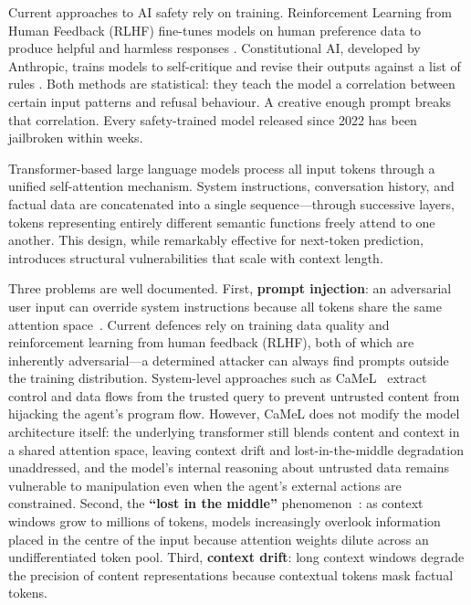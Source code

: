 \documentclass[11pt,a4paper]{article}
\theoremstyle{definition}
\begin{document}
Current approaches to AI safety rely on training. Reinforcement Learning from Human Feedback (RLHF) fine-tunes models on human preference data to produce helpful and harmless responses \cite{bai2022training}. Constitutional AI, developed by Anthropic, trains models to self-critique and revise their outputs against a list of rules \cite{bai2022constitutional}. Both methods are statistical: they teach the model a correlation between certain input patterns and refusal behaviour. A creative enough prompt breaks that correlation. Every safety-trained model released since 2022 has been jailbroken within weeks.

Transformer-based large language models \cite{Vaswani2017AttentionIA} process all input tokens through a unified self-attention mechanism. System instructions, conversation history, and factual data are concatenated into a single sequence---through successive layers, tokens representing entirely different semantic functions freely attend to one another. This design, while remarkably effective for next-token prediction, introduces structural vulnerabilities that scale with context length.

Three problems are well documented. First, \textbf{prompt injection}: an adversarial user input can override system instructions because all tokens share the same attention space~\cite{promptinjection2022}. Current defences rely on training data quality and reinforcement learning from human feedback (RLHF), both of which are inherently adversarial---a determined attacker can always find prompts outside the training distribution. System-level approaches such as CaMeL~\cite{debenedetti2025camel} extract control and data flows from the trusted query to prevent untrusted content from hijacking the agent's program flow. However, CaMeL does not modify the model architecture itself: the underlying transformer still blends content and context in a shared attention space, leaving context drift and lost-in-the-middle degradation unaddressed, and the model's internal reasoning about untrusted data remains vulnerable to manipulation even when the agent's external actions are constrained. Second, the \textbf{``lost in the middle''} phenomenon~\cite{lostinthemiddle2023}: as context windows grow to millions of tokens, models increasingly overlook information placed in the centre of the input because attention weights dilute across an undifferentiated token pool. Third, \textbf{context drift}: long context windows degrade the precision of content representations because contextual tokens mask factual tokens.
\end{document}
